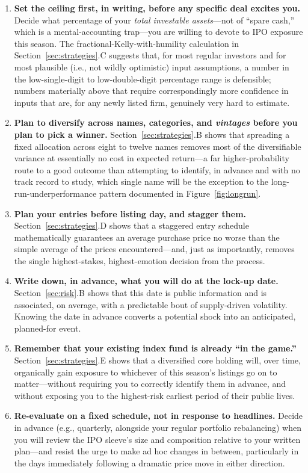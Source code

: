 \documentclass[conference]{IEEEtran}
\begin{document}
\begin{enumerate}
    \item \textbf{Set the ceiling first, in writing, before any specific deal excites you.} Decide what percentage of your \emph{total investable assets}---not of ``spare cash,'' which is a mental-accounting trap---you are willing to devote to IPO exposure this season. The fractional-Kelly-with-humility calculation in Section~\ref{sec:strategies}.C suggests that, for most regular investors and for most plausible (i.e., not wildly optimistic) input assumptions, a number in the low-single-digit to low-double-digit percentage range is defensible; numbers materially above that require correspondingly more confidence in inputs that are, for any newly listed firm, genuinely very hard to estimate.
    \item \textbf{Plan to diversify across names, categories, and \emph{vintages} before you plan to pick a winner.} Section~\ref{sec:strategies}.B shows that spreading a fixed allocation across eight to twelve names removes most of the diversifiable variance at essentially no cost in expected return---a far higher-probability route to a good outcome than attempting to identify, in advance and with no track record to study, which single name will be the exception to the long-run-underperformance pattern documented in Figure~\ref{fig:longrun}.
    \item \textbf{Plan your entries before listing day, and stagger them.} Section~\ref{sec:strategies}.D shows that a staggered entry schedule mathematically guarantees an average purchase price no worse than the simple average of the prices encountered---and, just as importantly, removes the single highest-stakes, highest-emotion decision from the process.
    \item \textbf{Write down, in advance, what you will do at the lock-up date.} Section~\ref{sec:risk}.B shows that this date is public information and is associated, on average, with a predictable bout of supply-driven volatility. Knowing the date in advance converts a potential shock into an anticipated, planned-for event.
    \item \textbf{Remember that your existing index fund is already ``in the game.''} Section~\ref{sec:strategies}.E shows that a diversified core holding will, over time, organically gain exposure to whichever of this season's listings go on to matter---without requiring you to correctly identify them in advance, and without exposing you to the highest-risk earliest period of their public lives.
    \item \textbf{Re-evaluate on a fixed schedule, not in response to headlines.} Decide in advance (e.g., quarterly, alongside your regular portfolio rebalancing) when you will review the IPO sleeve's size and composition relative to your written plan---and resist the urge to make ad hoc changes in between, particularly in the days immediately following a dramatic price move in either direction.
\end{enumerate}
\end{document}

